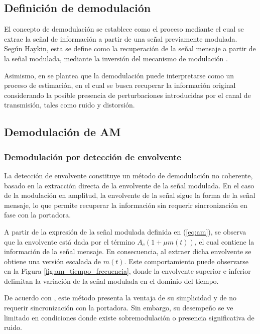 \subsection{Definición de demodulación}

El concepto de demodulación se establece como el proceso mediante el cual se extrae la señal de información a partir de una señal previamente modulada. Según Haykin, esta se define como la recuperación de la señal mensaje a partir de la señal modulada, mediante la inversión del mecanismo de modulación \cite{haykin2001}.

Asimismo, en \cite{proakis2007digital} se plantea que la demodulación puede interpretarse como un proceso de estimación, en el cual se busca recuperar la información original considerando la posible presencia de perturbaciones introducidas por el canal de transmisión, tales como ruido y distorsión.



\subsection{Demodulación de AM}

\subsubsection{Demodulación por detección de envolvente}

La detección de envolvente constituye un método de demodulación no coherente, basado en la extracción directa de la envolvente de la señal modulada. En el caso de la modulación en amplitud, la envolvente de la señal sigue la forma de la señal mensaje, lo que permite recuperar la información sin requerir sincronización en fase con la portadora.

A partir de la expresión de la señal modulada definida en (\ref{eq:am}), se observa que la envolvente está dada por el término \( A_c (1 + \mu m(t)) \), el cual contiene la información de la señal mensaje. En consecuencia, al extraer dicha envolvente se obtiene una versión escalada de \( m(t) \). Este comportamiento puede observarse en la Figura \ref{fig:am_tiempo_frecuencia}, donde la envolvente superior e inferior delimitan la variación de la señal modulada en el dominio del tiempo.

De acuerdo con \cite{haykin2001}, este método presenta la ventaja de su simplicidad y de no requerir sincronización con la portadora. Sin embargo, su desempeño se ve limitado en condiciones donde existe sobremodulación o presencia significativa de ruido.

